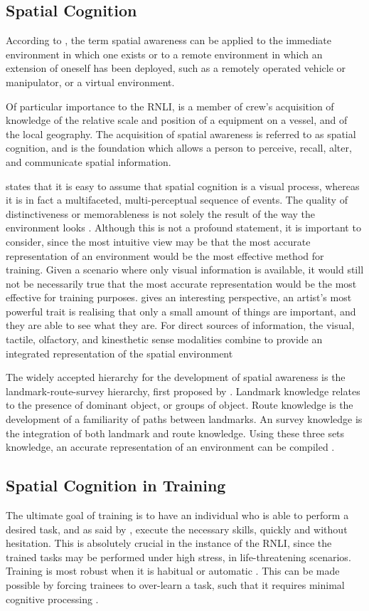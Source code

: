 \documentclass[a4paper, openright, twoside]{book}
\begin{document}
\subsection{Spatial Cognition}
According to \cite{stone}, the term spatial awareness can be applied to the immediate environment in which one exists or to a remote environment in which an extension of oneself has been deployed, such as a remotely operated vehicle or manipulator, or a virtual environment. 

Of particular importance to the RNLI, is a member of crew's acquisition of knowledge of the relative scale and position  of a  equipment on a vessel, and of the local geography. The acquisition of spatial awareness is referred to as spatial cognition, and is the foundation which allows a person to perceive, recall, alter, and communicate spatial information. 

 \cite{osberg} states that it is easy to assume that spatial cognition is a visual process, whereas it is in fact a multifaceted, multi-perceptual sequence of events.  The quality of distinctiveness or memorableness is not solely the result of the way the environment looks \citep{downs}. Although this is not a profound statement, it is important to consider, since the most intuitive view may be that the most accurate representation of an environment would be the most effective method for training. Given a scenario where only visual information is available, it would still not be necessarily true that the most accurate representation would be the most effective for training purposes. \cite{gleick} gives an interesting perspective, an artist's most powerful trait is realising that only a small amount of things are important, and they are able to see what they are. For direct sources of information, the visual, tactile, olfactory, and kinesthetic sense modalities combine to provide an integrated representation of the spatial environment  \citep{downs}

The widely accepted hierarchy for the development of spatial awareness is the landmark-route-survey hierarchy, first proposed by \cite{siegel}.  Landmark knowledge relates to the presence of dominant object, or groups of object. Route knowledge is the development of a familiarity of paths between landmarks. An survey knowledge is the integration of both landmark and route knowledge. Using these three sets knowledge, an accurate representation of an environment can be compiled \citep{stone}.  

\subsection{Spatial Cognition in Training}
The ultimate goal of training is to have an individual who is able to perform a desired task, and as said by \cite{hussein}, execute the necessary skills, quickly and without hesitation. This is absolutely crucial in the instance of the RNLI, since the trained tasks may be performed under high stress, in life-threatening scenarios. Training is most robust when it is habitual or automatic \citep{hussein}. This can be made possible by forcing trainees to over-learn a task, such that it requires minimal cognitive processing  \citep{kirlik}. 
\end{document}
